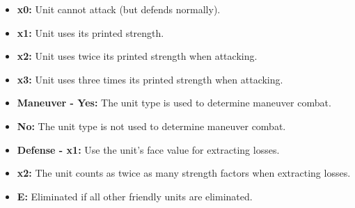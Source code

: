 \begin{minipage}{\textwidth}
  \begin{itemize}
    \item \textbf{x0:} Unit cannot attack (but defends normally).
    \item \textbf{x1:} Unit uses its printed strength.
    \item \textbf{x2:} Unit uses twice its printed strength when attacking.
    \item \textbf{x3:} Unit uses three times its printed strength when attacking.
    \item \textbf{Maneuver - Yes:} The unit type is used to determine maneuver combat.
    \item \hspace{6.5em}\textbf{No:} The unit type is not used to determine maneuver combat.
    \item \textbf{Defense - x1:} Use the unit's face value for extracting losses.
    \item \hspace{5em}\textbf{x2:} The unit counts as twice as many strength factors when extracting losses.
    \item \textbf{E:} Eliminated if all other friendly units are eliminated.
  \end{itemize}
\end{minipage}

\clearpage

{
  \def\arraystretch{1.1}
}

